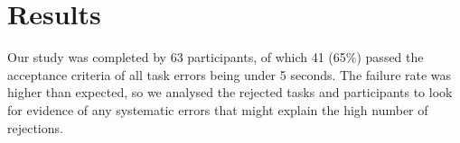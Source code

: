 




\clearpage
\section{Results}\label{sec:vis-results}
Our study was completed by 63 participants, of which 41 (65\%) passed the acceptance criteria of all task errors being
under 5 seconds. The failure rate was higher than expected, so we analysed the rejected tasks and participants to look
for evidence of any systematic errors that might explain the high number of rejections.

